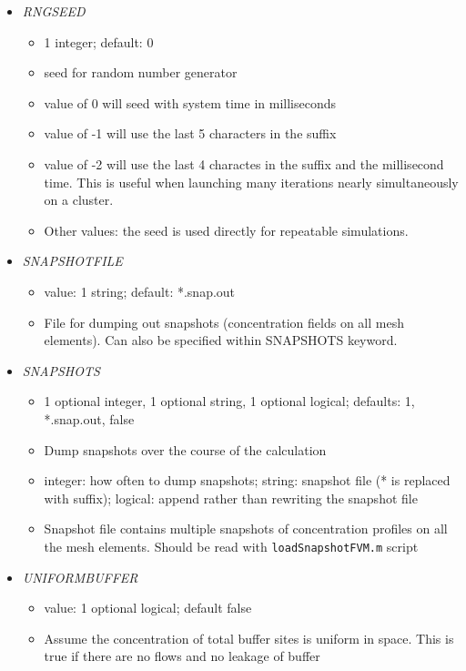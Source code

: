 \documentclass[12pt]{article}
\begin{document}
\begin{itemize}
%
\item {\it RNGSEED}
  \begin{itemize}
    \item 1 integer; default: 0
    \item seed for random number generator
    \item value of 0 will seed with system time in milliseconds
    \item value of -1 will use the last 5 characters in the suffix
    \item value of -2 will use the last 4 charactes in the suffix and the millisecond time. This is useful when launching many iterations nearly simultaneously on a cluster.
    \item Other values: the seed is used directly for repeatable simulations. 
  \end{itemize}
%
\item {\it SNAPSHOTFILE}
    \begin{itemize}
      \item  value: 1 string; default: *.snap.out
      \item File for dumping out snapshots (concentration fields on all mesh elements). Can also be specified within SNAPSHOTS keyword.
    \end{itemize}
%
\item {\it SNAPSHOTS}
\begin{itemize}
	\item 1 optional integer, 1 optional string, 1 optional logical; defaults: 1, *.snap.out, false
	\item Dump snapshots over the course of the calculation
	\item integer: how often to dump snapshots; string: snapshot file (* is replaced with suffix); logical: append rather than rewriting the snapshot file
	\item Snapshot file contains multiple snapshots of concentration profiles on all the mesh elements. Should be read with \verb=loadSnapshotFVM.m= script
\end{itemize}
%
\item {\it UNIFORMBUFFER}
\begin{itemize}
	\item  value: 1 optional logical; default false
	\item Assume the concentration of total buffer sites is uniform in space. This is true if there are no flows and  no leakage of buffer

\end{itemize}
\end{itemize}
\end{document}
